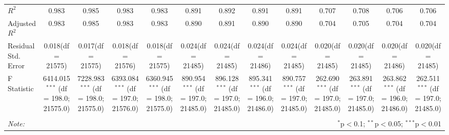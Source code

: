 \begin{table}[!htbp]
\begin{tabular}{@{\extracolsep{5pt}}lcccccccccccc}
 $R^2$ & 0.983 & 0.985 & 0.983 & 0.983 & 0.891 & 0.892 & 0.891 & 0.891 & 0.707 & 0.708 & 0.706 & 0.706 \\
 Adjusted $R^2$ & 0.983 & 0.985 & 0.983 & 0.983 & 0.890 & 0.891 & 0.890 & 0.890 & 0.704 & 0.705 & 0.704 & 0.704 \\
 Residual Std. Error & 0.018(df = 21575) & 0.017(df = 21575) & 0.018(df = 21576) & 0.018(df = 21575) & 0.024(df = 21485) & 0.024(df = 21485) & 0.024(df = 21486) & 0.024(df = 21485) & 0.020(df = 21485) & 0.020(df = 21485) & 0.020(df = 21486) & 0.020(df = 21485)  \\
 F Statistic & 6414.015$^{***}$ (df = 198.0; 21575.0) & 7228.983$^{***}$ (df = 198.0; 21575.0) & 6393.084$^{***}$ (df = 197.0; 21576.0) & 6360.945$^{***}$ (df = 198.0; 21575.0) & 890.954$^{***}$ (df = 197.0; 21485.0) & 896.128$^{***}$ (df = 197.0; 21485.0) & 895.341$^{***}$ (df = 196.0; 21486.0) & 890.757$^{***}$ (df = 197.0; 21485.0) & 262.690$^{***}$ (df = 197.0; 21485.0) & 263.891$^{***}$ (df = 197.0; 21485.0) & 263.862$^{***}$ (df = 196.0; 21486.0) & 262.511$^{***}$ (df = 197.0; 21485.0) \\
\hline
\hline \\[-1.8ex]
\textit{Note:} & \multicolumn{12}{r}{$^{*}$p$<$0.1; $^{**}$p$<$0.05; $^{***}$p$<$0.01} \\
\end{tabular}
\end{table}
